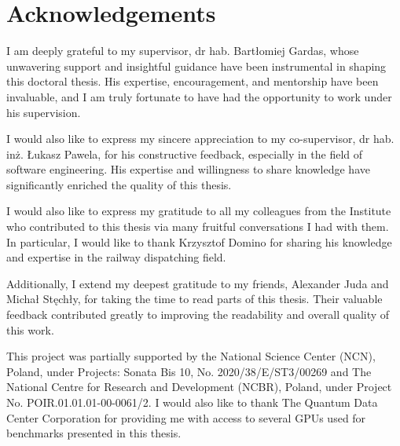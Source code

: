 \chapter{Acknowledgements}

I am deeply grateful to my supervisor, dr hab. Bartłomiej Gardas, whose unwavering support and insightful guidance have been instrumental in shaping this doctoral thesis. His expertise, encouragement, and mentorship have been invaluable, and I am truly fortunate to have had the opportunity to work under his supervision.

I would also like to express my sincere appreciation to my co-supervisor, dr hab. inż. Łukasz Pawela, for his constructive feedback, especially in the field of software engineering. His expertise and willingness to share knowledge have significantly enriched the quality of this thesis.

I would also like to express my gratitude to all my colleagues from the Institute who contributed to this thesis via many fruitful conversations I had with them. In particular, I would like to thank Krzysztof Domino for sharing his knowledge and expertise in the railway dispatching field.

Additionally, I extend my deepest gratitude to my friends, Alexander Juda and Michał Stęchły, for taking the time to read parts of this thesis. Their valuable feedback contributed greatly to improving the readability and overall quality of this work.

This project was partially supported by the National Science Center (NCN), Poland, under Projects: Sonata Bis 10, No. 2020/38/E/ST3/00269
and The National Centre for Research and Development (NCBR), Poland, under Project No. POIR.01.01.01-00-0061/2. I would also like to thank The Quantum Data Center Corporation for providing me with access to several GPUs used for benchmarks presented in this thesis.

